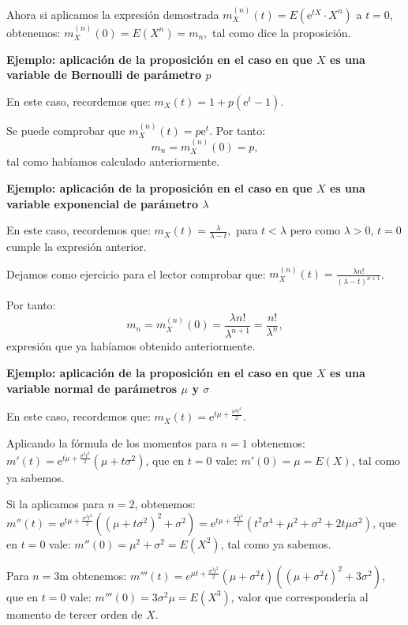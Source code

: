 \documentclass[
  letterpaper,
  DIV=11,
  numbers=noendperiod]{scrreprt}
\begin{document}
Ahora si aplicamos la expresión demostrada
\(m_X^{(n)}(t) =E\left(\mathrm{e}^{tX}\cdot X^n\right)\) a \(t=0\),
obtenemos: \(m_X^{(n)}(0) =E\left(X^n\right)=m_n,\) tal como dice la
proposición.

\textbf{Ejemplo: aplicación de la proposición en el caso en que \(X\) es
una variable de Bernoulli de parámetro \(p\)}

En este caso, recordemos que:
\(m_X (t)=1+p\left(\mathrm{e}^t -1 \right).\)

Se puede comprobar que \(m_X^{(n)}(t)=p\mathrm{e}^t\). Por tanto: \[
m_n = m_X^{(n)}(0)=p,
\] tal como habíamos calculado anteriormente.

\textbf{Ejemplo: aplicación de la proposición en el caso en que \(X\) es
una variable exponencial de parámetro \(\lambda\)}

En este caso, recordemos que: \(m_X (t)=\frac{\lambda}{\lambda -t},\)
para \(t<\lambda\) pero como \(\lambda >0\), \(t=0\) cumple la expresión
anterior.

Dejamos como ejercicio para el lector comprobar que:
\(m_X^{(n)}(t)=\frac{\lambda n!}{(\lambda-t)^{n+1}}\).

Por tanto: \[
m_n = m_X^{(n)}(0) = \frac{\lambda n!}{\lambda^{n+1}}=\frac{n!}{\lambda^n},
\] expresión que ya habíamos obtenido anteriormente.

\textbf{Ejemplo: aplicación de la proposición en el caso en que \(X\) es
una variable normal de parámetros \(\mu\) y \(\sigma\)}

En este caso, recordemos que:
\(m_X (t)=\mathrm{e}^{ t \mu +\frac{\sigma^2 t^2}{2}}.\)

Aplicando la fórmula de los momentos para \(n=1\) obtenemos:
\(m'(t)=\mathrm{e}^{ t \mu +\frac{\sigma^2 t^2}{2}} \left(\mu+t\sigma^2\right)\),
que en \(t=0\) vale: \(m'(0)=\mu=E(X)\), tal como ya sabemos.

Si la aplicamos para \(n=2\), obtenemos:
\(m''(t)=\mathrm{e}^{ t \mu +\frac{\sigma^2 t^2}{2}} \left((\mu+t\sigma^2)^2+ \sigma^2 \right) =\mathrm{e}^{ t \mu +\frac{\sigma^2 t^2}{2}} \left(t^2\sigma^4+\mu^2+\sigma^2+ 2t\mu\sigma^2 \right)\),
que en \(t=0\) vale: \(m''(0)=\mu^2+\sigma^2=E\left(X^2\right)\), tal
como ya sabemos.

Para \(n=3\)m obtenemos:
\(m'''(t)=e^{\mu t+\frac{\sigma ^2 t^2}{2}}\left(\mu +\sigma ^2 t\right) \left(\left(\mu +\sigma ^2 t\right)^2+3 \sigma ^2\right)\),
que en \(t=0\) vale: \(m'''(0)=3\sigma^2\mu = E\left(X^3\right)\), valor
que correspondería al momento de tercer orden de \(X\).
\end{document}
